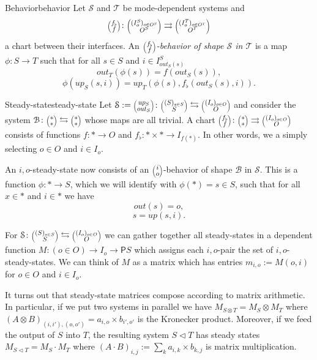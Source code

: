 \documentclass[12pt, a4paper]{article}
\theoremstyle{definition}
\theoremstyle{plain}
\theoremstyle{plain}
\theoremstyle{plain}
\theoremstyle{plain}
\theoremstyle{plain}
\theoremstyle{remark}
\theoremstyle{remark}
\newcommand{\mc}[1]{\mathcal{#1}}
\newcommand{\lens}[2]{\scaleobj{0.6}{\begin{pmatrix} \scaleobj{1.3}{{#1}} \\ \scaleobj{1.3}{{#2}} \end{pmatrix}}}
\begin{document}
\begin{tcdefinition}{Behavior}{behavior}
	Let $\mc{S}$ and $\mc{T}$ be mode-dependent systems and $$\lens{f_\flat}{f} \colon \lens{(I^S_o)_{o \in O^S}}{O^S} \rightrightarrows \lens{(I^T_o)_{o \in O^T}}{O^T}$$
	a chart between their interfaces. An \emph{$\lens{f_\flat}{f}$-behavior of shape $\mc{S}$ in $\mc{T}$} is a map $\phi: S \rightarrow T$ such that for all $s \in S$ and $i \in I^S_{out_S(s)}$
	$$out_T(\phi(s)) = f(out_S(s)), $$
	$$\phi(up_S(s,i)) = up_T(\phi(s), f_\flat(out_S(s),i)).$$
\end{tcdefinition}

\begin{tcdefinition}{Steady-state}{steady-state}
	Let $\mc{S} := \lens{up_S}{out_S} \colon \lens{(S)_{s \in S}}{S} \leftrightarrows \lens{(I_o)_{o \in O}}{O}$ and consider the system $\mc{B} \colon \lens{*}{*} \leftrightarrows \lens{*}{*}$ whose maps are all trivial. A chart $\lens{f_\flat}{f} \colon \lens{*}{*} \rightrightarrows \lens{(I_o)_{o \in O}}{O}$ consists of functions $f \colon * \rightarrow O$ and $f_\flat \colon * \times * \rightarrow I_{f(*)}$. In other words, we a simply selecting $o \in O$ and $i \in I_o$. 

	An $i,o$-steady-state now consists of an $\lens{i}{o}$-behavior of shape $\mc{B}$ in $\mc{S}$. This is a function $\phi \colon * \rightarrow S$, which we will identify with $\phi(*) = s \in S$, such that for all $x \in *$ and $i \in *$ we have
	$$out(s) = o, $$
	$$s = up(s,i).$$
\end{tcdefinition}

For $\mc{S} \colon \lens{(S)_{s \in S}}{S} \leftrightarrows \lens{(I_o)_{o \in O}}{O}$ we can gather together all steady-states in a dependent function $M: (o \in O) \rightarrow I_o \rightarrow \mathsf{P}S$ which assigns each $i,o$-pair the set of $i,o$-steady-states. We can think of $M$ as a matrix which has entries $m_{i,o} := M(o,i)$ for $o \in O$ and $i \in I_o$.

It turns out that steady-state matrices compose according to matrix arithmetic. In particular, if we put two systems in parallel we have $M_{S \otimes T} = M_S \otimes M_T $ where $(A \otimes B)_{(i,i'),(o,o')} = a_{i,o} \times b_{i',o'}$ is the Kronecker product. Moreover, if we feed the output of $S$ into $T$, the resulting system $S \triangleleft T$ has steady states $M_{S \triangleleft T} = M_S \cdot M_T$ where $(A \cdot B)_{i,j} := \sum_{k} a_{i,k} \times b_{k,j}$ is matrix multiplication.
\end{document}
